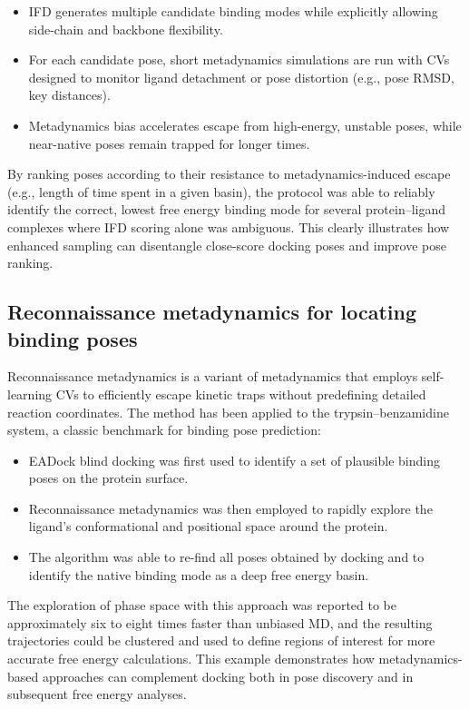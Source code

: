 \documentclass[12pt,a4paper]{article}
\begin{document}
\begin{itemize}
\item IFD generates multiple candidate binding modes while explicitly allowing side-chain and backbone flexibility.
\item For each candidate pose, short metadynamics simulations are run with CVs designed to monitor ligand detachment or pose distortion (e.g., pose RMSD, key distances).
\item Metadynamics bias accelerates escape from high-energy, unstable poses, while near-native poses remain trapped for longer times.
\end{itemize}

By ranking poses according to their resistance to metadynamics-induced escape (e.g., length of time spent in a given basin), the protocol was able to reliably identify the correct, lowest free energy binding mode for several protein--ligand complexes where IFD scoring alone was ambiguous.\cite{Capelli2022} This clearly illustrates how enhanced sampling can disentangle close-score docking poses and improve pose ranking.

\subsection{Reconnaissance metadynamics for locating binding poses}

Reconnaissance metadynamics is a variant of metadynamics that employs self-learning CVs to efficiently escape kinetic traps without predefining detailed reaction coordinates.\cite{GilLey2012} The method has been applied to the trypsin--benzamidine system, a classic benchmark for binding pose prediction:

\begin{itemize}
\item EADock blind docking was first used to identify a set of plausible binding poses on the protein surface.
\item Reconnaissance metadynamics was then employed to rapidly explore the ligand's conformational and positional space around the protein.
\item The algorithm was able to re-find all poses obtained by docking and to identify the native binding mode as a deep free energy basin.
\end{itemize}

The exploration of phase space with this approach was reported to be approximately six to eight times faster than unbiased MD, and the resulting trajectories could be clustered and used to define regions of interest for more accurate free energy calculations.\cite{GilLey2012} This example demonstrates how metadynamics-based approaches can complement docking both in pose discovery and in subsequent free energy analyses.
\end{document}
